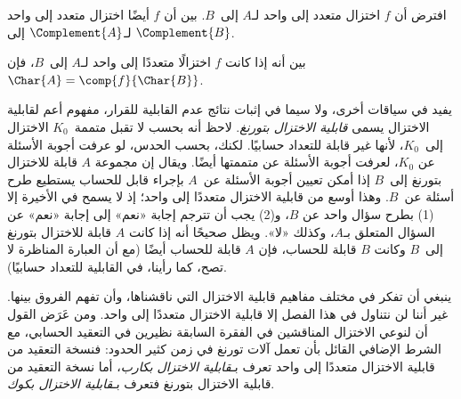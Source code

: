 \documentclass[../../../include/open-logic-section]{subfiles}
\begin{document}
\begin{prob}
افترض أن $f$ اختزال متعدد إلى واحد لـ$A$ إلى~$B$. بين أن $f$ أيضًا
اختزال متعدد إلى واحد لـ$\Complement{A}$ إلى $\Complement{B}$.
\end{prob}

\begin{prob}
بين أنه إذا كانت $f$ اختزالًا متعددًا إلى واحد لـ$A$ إلى~$B$، فإن
$\Char{A}=\comp{f}{\Char{B}}$.
\end{prob}

\begin{digress}
يفيد في سياقات أخرى، ولا سيما في إثبات نتائج عدم القابلية للقرار، مفهوم
أعم لقابلية الاختزال يسمى \emph{قابلية الاختزال بتورنغ}. لاحظ أنه بحسب
 لا تقبل متممة~$K_0$ الاختزال إلى~$K_0$، لأنها
غير قابلة للتعداد حسابيًا. لكنك، بحسب الحدس، لو عرفت أجوبة الأسئلة عن
$K_0$، لعرفت أجوبة الأسئلة عن متممتها أيضًا. ويقال إن مجموعة $A$
قابلة للاختزال بتورنغ إلى~$B$ إذا أمكن تعيين أجوبة الأسئلة عن~$A$
بإجراء قابل للحساب يستطيع طرح أسئلة عن~$B$. وهذا أوسع من قابلية
الاختزال متعددًا إلى واحد؛ إذ لا يسمح في الأخيرة إلا (1) بطرح سؤال
واحد عن $B$، و(2) يجب أن تترجم إجابة «نعم» إلى إجابة «نعم» عن السؤال
المتعلق بـ$A$، وكذلك «لا». ويظل صحيحًا أنه إذا كانت $A$ قابلة للاختزال
بتورنغ إلى~$B$ وكانت $B$ قابلة للحساب، فإن $A$ قابلة للحساب أيضًا
(مع أن العبارة المناظرة لا تصح، كما رأينا، في القابلية للتعداد حسابيًا).

ينبغي أن تفكر في مختلف مفاهيم قابلية الاختزال التي ناقشناها، وأن تفهم
الفروق بينها. غير أننا لن نتناول في هذا الفصل إلا قابلية الاختزال
متعددًا إلى واحد. ومن عَرَض القول أن لنوعي الاختزال المناقشين في الفقرة
السابقة نظيرين في التعقيد الحسابي، مع الشرط الإضافي القائل بأن تعمل
آلات تورنغ في زمن كثير الحدود: فنسخة التعقيد من قابلية الاختزال متعددًا
إلى واحد تعرف بـ\emph{قابلية الاختزال بكارب}، أما نسخة التعقيد من
قابلية الاختزال بتورنغ فتعرف بـ\emph{قابلية الاختزال بكوك}.
\end{digress}
\end{document}
